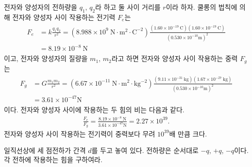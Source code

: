 \documentclass[floatfix,nofootinbib,superscriptaddress,fleqn,notitlepage]{revtex4-2}
\begin{document}
 전자와 양성자의 전하량을 $q_1$, $q_2$라 하고 둘 사이 거리를 $r$이라 하자.
쿨롱의 법칙에 의해 전자와 양성자 사이 작용하는 전기력 $F_e$는
\begin{align}
  \begin{split}
    F_e &= k\frac{q_1q_2}{r^2} = (8.988\times 10^{9}~\mathrm{N\cdot m^2\cdot C^{-2}})
    \frac{(1.60\times 10^{-19}~\mathrm{C})(1.60\times 10^{-19}~\mathrm{C})}
    {(0.530\times 10^{-10}\mathrm{m})^2} \\
    &= 8.19\times 10^{-8}~\mathrm{N}
  \end{split}
\end{align}
이고, 전자와 양성자의 질량을 $m_1$, $m_2$라고 하면 전자와 양성자 사이 작용하는 중력 $F_g$는
\begin{align}
  \begin{split}
    F_g &= G\frac{m_1m_2}{r^2}=(6.67\times 10^{-11}~\mathrm{N\cdot m^2\cdot kg^{-2}})
    \frac{{(9.11\times 10^{-31}~\mathrm{kg})}
    {(1.67\times 10^{-27}~\mathrm{kg})}}{(0.530\times 10^{-10}\mathrm{m})^2}\\
    &=3.61\times 10^{-47}\mathrm{N}
  \end{split}
\end{align}
이다. 전자와 양성자 사이에 작용하는 두 힘의 비는 다음과 같다.
\begin{align}
  \frac{F_e}{F_g}=\frac{8.19\times 10^{-8}~\mathrm{N}}{3.61\times 10^{-47}\mathrm{N}}
  =2.27\times 10^{39}.
\end{align} 
전자와 양성자 사이 작용하는 전기력이 중력보다 무려 $10^{39}$배 만큼 크다.

\vspace{1.cm}
일직선상에 세 점전하가 간격 $d$를 두고 놓여 있다. 전하량은 순서대로
$-q$, $+q$, $-q$이다. 각 전하에 작용하는 힘을 구하여라.
\vspace{1.cm}
\end{document}
